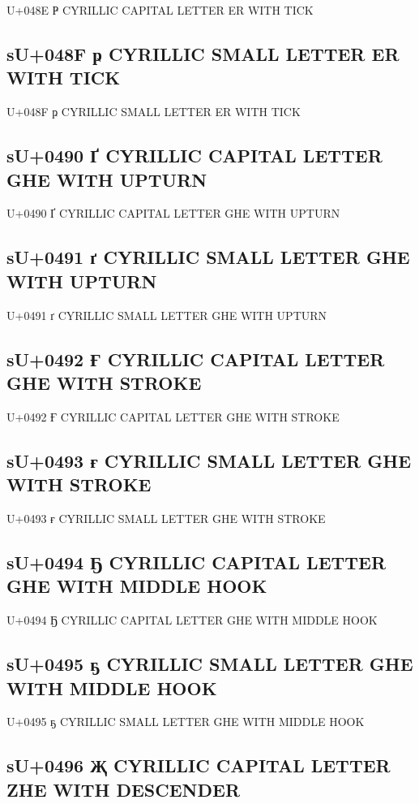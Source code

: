 U+048E Ҏ  CYRILLIC CAPITAL LETTER ER WITH TICK

\subsection{sU+048F ҏ  CYRILLIC SMALL LETTER ER WITH TICK}

U+048F ҏ  CYRILLIC SMALL LETTER ER WITH TICK

\subsection{sU+0490 Ґ  CYRILLIC CAPITAL LETTER GHE WITH UPTURN}

U+0490 Ґ  CYRILLIC CAPITAL LETTER GHE WITH UPTURN

\subsection{sU+0491 ґ  CYRILLIC SMALL LETTER GHE WITH UPTURN}

U+0491 ґ  CYRILLIC SMALL LETTER GHE WITH UPTURN

\subsection{sU+0492 Ғ  CYRILLIC CAPITAL LETTER GHE WITH STROKE}

U+0492 Ғ  CYRILLIC CAPITAL LETTER GHE WITH STROKE

\subsection{sU+0493 ғ  CYRILLIC SMALL LETTER GHE WITH STROKE}

U+0493 ғ  CYRILLIC SMALL LETTER GHE WITH STROKE

\subsection{sU+0494 Ҕ  CYRILLIC CAPITAL LETTER GHE WITH MIDDLE HOOK}

U+0494 Ҕ  CYRILLIC CAPITAL LETTER GHE WITH MIDDLE HOOK

\subsection{sU+0495 ҕ  CYRILLIC SMALL LETTER GHE WITH MIDDLE HOOK}

U+0495 ҕ  CYRILLIC SMALL LETTER GHE WITH MIDDLE HOOK

\subsection{sU+0496 Җ  CYRILLIC CAPITAL LETTER ZHE WITH DESCENDER}

